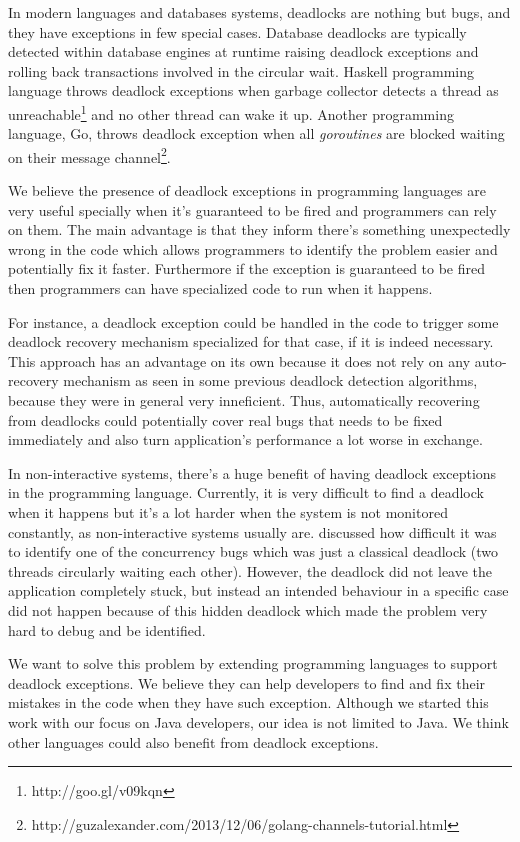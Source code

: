 In modern languages and databases systems, deadlocks are nothing but bugs, and they have exceptions in few special cases.
Database deadlocks are typically detected within database engines at runtime \citep{grechanik} raising deadlock exceptions and rolling back transactions
involved in the circular wait. Haskell programming language throws deadlock exceptions when garbage collector detects a thread as unreachable\footnote{http://goo.gl/v09kqn}
and no other thread can wake it up. Another programming language, Go, throws deadlock exception when all \emph{goroutines} are blocked waiting on their message channel\footnote{http://guzalexander.com/2013/12/06/golang-channels-tutorial.html}.

We believe the presence of deadlock exceptions in programming languages are very useful specially when it's guaranteed to be fired and programmers can rely on them.
The main advantage is that they inform there's something unexpectedly wrong in the code which allows programmers to identify the problem easier and potentially fix it faster.
Furthermore if the exception is guaranteed to be fired then programmers can have specialized code to run when it happens.

For instance, a deadlock exception could be handled in the code to trigger some deadlock recovery mechanism specialized for that case, if it is indeed necessary.
This approach has an advantage on its own because it does not rely on any auto-recovery mechanism as seen in some previous deadlock detection algorithms,
because they were in general very inneficient. Thus, automatically recovering from deadlocks could potentially cover real bugs that needs to be fixed immediately
and also turn application's performance a lot worse in exchange.

In non-interactive systems, there's a huge benefit of having deadlock exceptions in the programming language.
Currently, it is very difficult to find a deadlock when it happens but it's a lot harder when the system is not monitored constantly, as non-interactive systems usually are.
\citet{ian} discussed how difficult it was to identify one of the concurrency bugs which was just a classical deadlock (two threads circularly waiting each other). However, the deadlock did not leave the application completely stuck, but instead an intended behaviour in a specific case did not happen because of this hidden deadlock
which made the problem very hard to debug and be identified.

We want to solve this problem by extending programming languages to support deadlock exceptions.
We believe they can help developers to find and fix their mistakes in the code when they have such exception.
Although we started this work with our focus on Java developers, our idea is not limited to Java.
We think other languages could also benefit from deadlock exceptions.